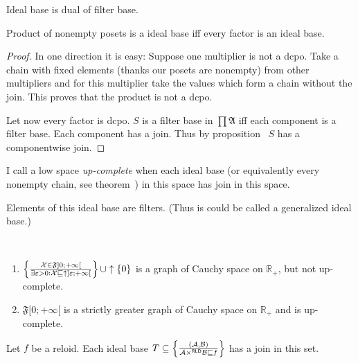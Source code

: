 \begin{obvious}
Ideal base is dual of filter base.
\end{obvious}

\begin{thm}
  Product of nonempty posets is a ideal base iff every factor is an ideal
  base.
\end{thm}

\begin{proof}
  
  In one direction it is easy: Suppose one multiplier is not a dcpo. Take a
  chain with fixed elements (thanks our posets are nonempty) from other
  multipliers and for this multiplier take the values which form a chain
  without the join. This proves that the product is not a dcpo.
  
  Let now every factor is dcpo. $S$ is a filter base in $\prod \mathfrak{A}$
  iff each component is a filter base. Each component has a join. Thus by proposition~ $S$ has a componentwise join.
\end{proof}

\begin{defn}
  I call a low space \emph{up-complete} when each ideal base (or
  equivalently every nonempty chain, see theorem~) in this space has join in
  this space.
\end{defn}

\begin{rem}
  Elements of this ideal base are filters. (Thus is could be called a
  generalized ideal base.)
\end{rem}

\begin{example}
  ~  
  \begin{enumerate}
    \item $\left\{ \frac{ \mathcal{X} \in \mathfrak{F} ]0 ; + \infty[ }{
    \exists \varepsilon > 0 : \mathcal{X} \sqsubseteq \uparrow
    ]\varepsilon ; + \infty[ }\right\} \cup \uparrow\{ 0 \}$ is a graph of Cauchy space
    on $\mathbb{R}_+$, but not up-complete.
    
    \item $\mathfrak{F} [0 ; + \infty[$ is a strictly greater graph of Cauchy
    space on $\mathbb{R}_+$ and is up-complete.
  \end{enumerate}
\end{example}

\begin{lem}
  Let $f$ be a reloid. Each ideal base $T \subseteq \left\{ \frac{ (\mathcal{A} ,
  \mathcal{B}) }{ \mathcal{A}
  \times^{\mathsf{RLD}} \mathcal{B} \sqsubseteq f }\right\}$ has a join
  in this set.
\end{lem}

